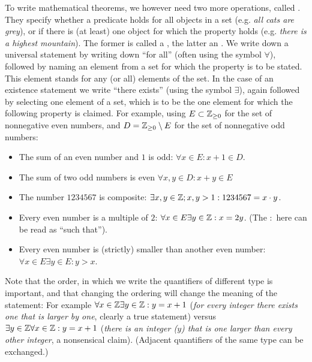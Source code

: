 To write mathematical theorems, we however need two more operations, called
. They specify whether a predicate holds for all objects
in a set (e.g. {\em all cats are grey}), or if there is (at least) one
object for which the property holds (e.g. {\em there is a highest
mountain}). The former is called a , the latter
an .
We write down a universal statement
by writing down ``for all'' (often using the symbol $\forall$), followed by
naming an element from a set for which the property is to be stated. This
element stands for any (or all) elements of the set.
In the case of an existence statement we write ``there exists'' (using the
symbol $\exists$), again followed by selecting one element of a set, which
is to be the one element for which the following property is claimed.
For example,
using $E\subset{\mathbb Z}_{\ge 0}$ for the set of nonnegative even numbers, and
$D={\mathbb Z}_{\ge 0}\setminus E$ for the
set of nonnegative odd numbers:
\begin{itemize}
\item The sum of an even number and $1$ is odd: 
$\forall x\in E: x+1\in D$.
\item The sum of two odd numbers is even
$\forall x,y\in D:x+y\in E$
\item
The number $1234567$ is composite: $\exists x,y\in{\mathbb Z}; x,y>1: 1234567=x\cdot
y$.
\item
Every even number is a multiple of $2$: $\forall x\in E\exists y\in{\mathbb Z}:
x=2y$. (The $:$ here can be read as ``such that'').
\item 
Every even number is (strictly) smaller than another even number:
$\forall x\in E\exists y\in E:y>x$.
\end{itemize}

Note that the order, in which we write the quantifiers of different type is important, and
that changing the ordering will change the meaning of the statement: For
example $\forall x\in{\mathbb Z}\exists y\in {\mathbb Z}: y=x+1$ ({\em for every integer there
exists one that is larger by one}, clearly a true statement) versus $\exists
y\in {\mathbb Z}\forall x\in{\mathbb Z}: y=x+1$ ({\em there is an integer ($y$) that is one
larger than every other integer}, a nonsensical claim).
(Adjacent quantifiers of the same type can be exchanged.)
\medskip

